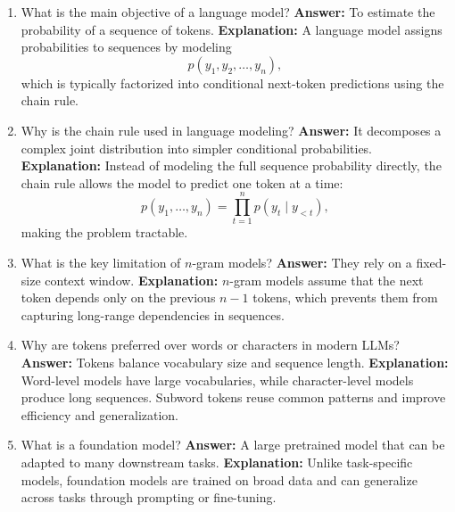 \documentclass{article}
\begin{document}
\begin{enumerate}

\item What is the main objective of a language model?\newline
\textbf{Answer:} To estimate the probability of a sequence of tokens.\newline
\textbf{Explanation:} A language model assigns probabilities to sequences by modeling
\[
p(y_1, y_2, \dots, y_n),
\]
which is typically factorized into conditional next-token predictions using the chain rule.

\item Why is the chain rule used in language modeling?\newline
\textbf{Answer:} It decomposes a complex joint distribution into simpler conditional probabilities.\newline
\textbf{Explanation:} Instead of modeling the full sequence probability directly, the chain rule allows the model to predict one token at a time:
\[
p(y_1,\dots,y_n)=\prod_{t=1}^{n} p(y_t \mid y_{<t}),
\]
making the problem tractable.

\item What is the key limitation of $n$-gram models?\newline
\textbf{Answer:} They rely on a fixed-size context window.\newline
\textbf{Explanation:} $n$-gram models assume that the next token depends only on the previous $n-1$ tokens, which prevents them from capturing long-range dependencies in sequences.

\item Why are tokens preferred over words or characters in modern LLMs?\newline
\textbf{Answer:} Tokens balance vocabulary size and sequence length.\newline
\textbf{Explanation:} Word-level models have large vocabularies, while character-level models produce long sequences. Subword tokens reuse common patterns and improve efficiency and generalization.

\item What is a foundation model?\newline
\textbf{Answer:} A large pretrained model that can be adapted to many downstream tasks.\newline
\textbf{Explanation:} Unlike task-specific models, foundation models are trained on broad data and can generalize across tasks through prompting or fine-tuning.


\end{enumerate}
\end{document}
